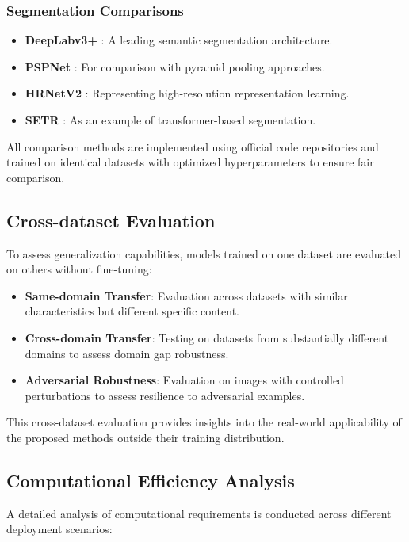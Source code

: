 \subsubsection{Segmentation Comparisons}
\begin{itemize}
    \item \textbf{DeepLabv3+} \cite{chen2018encoder}: A leading semantic segmentation architecture.
    
    \item \textbf{PSPNet} \cite{zhao2017pyramid}: For comparison with pyramid pooling approaches.
    
    \item \textbf{HRNetV2} \cite{wang2020deep}: Representing high-resolution representation learning.
    
    \item \textbf{SETR} \cite{zheng2021rethinking}: As an example of transformer-based segmentation.
\end{itemize}

All comparison methods are implemented using official code repositories and trained on identical datasets with optimized hyperparameters to ensure fair comparison.

\subsection{Cross-dataset Evaluation}
To assess generalization capabilities, models trained on one dataset are evaluated on others without fine-tuning:

\begin{itemize}
    \item \textbf{Same-domain Transfer}: Evaluation across datasets with similar characteristics but different specific content.
    
    \item \textbf{Cross-domain Transfer}: Testing on datasets from substantially different domains to assess domain gap robustness.
    
    \item \textbf{Adversarial Robustness}: Evaluation on images with controlled perturbations to assess resilience to adversarial examples.
\end{itemize}

This cross-dataset evaluation provides insights into the real-world applicability of the proposed methods outside their training distribution.

\subsection{Computational Efficiency Analysis}
A detailed analysis of computational requirements is conducted across different deployment scenarios:

